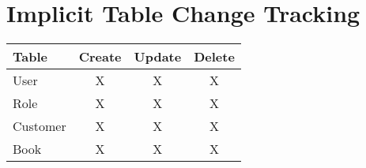 \part{Implicit Table Change Tracking}
\begin{small}
\begin{tabular}{ p{5cm} c c c }
\textbf{Table} & \textbf{Create} & \textbf{Update} & \textbf{Delete} \\ \hline 
User & X & X & X \\ 
Role & X & X & X \\ 
Customer & X & X & X \\ 
Book & X & X & X \\ 
\end{tabular}
\end{small}
